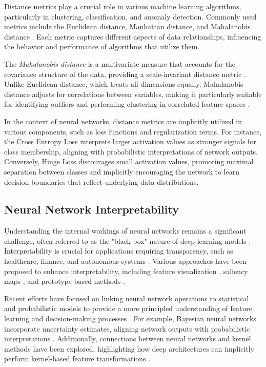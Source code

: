 Distance metrics play a crucial role in various machine learning algorithms, particularly in clustering, classification, and anomaly detection. Commonly used metrics include the Euclidean distance, Manhattan distance, and Mahalanobis distance \citep{hastie2009elements}. Each metric captures different aspects of data relationships, influencing the behavior and performance of algorithms that utilize them.

The \textit{Mahalanobis distance} is a multivariate measure that accounts for the covariance structure of the data, providing a scale-invariant distance metric \citep{mahalanobis1936generalized}. Unlike Euclidean distance, which treats all dimensions equally, Mahalanobis distance adjusts for correlations between variables, making it particularly suitable for identifying outliers and performing clustering in correlated feature spaces \citep{demaesschalck2000mahalanobis}.

In the context of neural networks, distance metrics are implicitly utilized in various components, such as loss functions and regularization terms. For instance, the Cross Entropy Loss \citep{bishop1995neural} interprets larger activation values as stronger signals for class membership, aligning with probabilistic interpretations of network outputs. Conversely, Hinge Loss \citep{cortes1995support} discourages small activation values, promoting maximal separation between classes and implicitly encouraging the network to learn decision boundaries that reflect underlying data distributions.

\subsection{Neural Network Interpretability}

Understanding the internal workings of neural networks remains a significant challenge, often referred to as the "black-box" nature of deep learning models \citep{lipton2016mythos}. Interpretability is crucial for applications requiring transparency, such as healthcare, finance, and autonomous systems \citep{rudin2019stop}. Various approaches have been proposed to enhance interpretability, including feature visualization \citep{erhan2009visualizing}, saliency maps \citep{simonyan2013deep}, and prototype-based methods \citep{kim2016interpretability}.

Recent efforts have focused on linking neural network operations to statistical and probabilistic models to provide a more principled understanding of feature learning and decision-making processes \citep{bengio2013representation, goodfellow2016deep}. For example, Bayesian neural networks incorporate uncertainty estimates, aligning network outputs with probabilistic interpretations \citep{neal1996bayesian, blundell2015weight}. Additionally, connections between neural networks and kernel methods have been explored, highlighting how deep architectures can implicitly perform kernel-based feature transformations \citep{rahimi2008random}.

